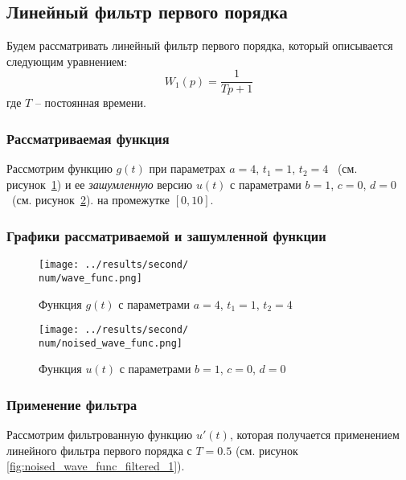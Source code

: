 \subsection{Линейный фильтр первого порядка}

Будем рассматривать линейный фильтр первого порядка, который описывается следующим уравнением:
\begin{equation}
    W_1(p) = \frac{1}{Tp + 1}
\end{equation}
где $T$ -- постоянная времени.

\def\num{1}
\def\a{4}
\def\from{1}
\def\to{4}
\def\b{1}
\def\c{0}
\def\d{0}
\def\L{10}
\def\T{0.5}

\subsubsection{Рассматриваемая функция}
Рассмотрим функцию $g(t)$ при параметрах $a=\a$, $t_1 = \from$, $t_2 = \to$ ~(см. рисунок~\ref{fig:wave_func_\num}) 
и ее \textit{зашумленную} версию $u(t)$ с параметрами $b = \b$, $c = \c$, $d = \d$ ~(см. рисунок~\ref{fig:noised_wave_func_\num}).
на промежутке $[0,\L]$. 

\subsubsection{Графики рассматриваемой и зашумленной функции}
\begin{figure}[ht!]
    \centering
    \texttt{[image: ../results/second/\\num/wave\_func.png]}
    \caption{Функция $g(t)$ с параметрами $a = \a$, $t_1 = \from$, $t_2 = \to$}
    \label{fig:wave_func_\num}
\end{figure}

\begin{figure}[ht!]
    \centering
    \texttt{[image: ../results/second/\\num/noised\_wave\_func.png]}
    \caption{Функция $u(t)$ с параметрами $b = \b$, $c = \c$, $d = \d$}
    \label{fig:noised_wave_func_\num}
\end{figure}

\FloatBarrier
\subsubsection{Применение фильтра}

Рассмотрим фильтрованную функцию $u'(t)$, которая получается применением линейного фильтра первого порядка с $T = \T$ (см. рисунок \ref{fig:noised_wave_func_filtered_\num}).

